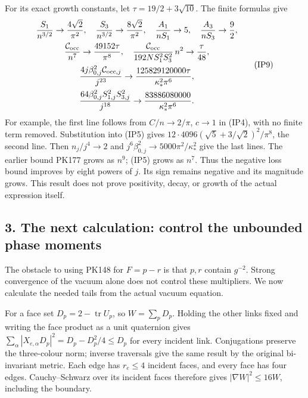 \documentclass[11pt]{article}
\begin{document}
For its exact growth constants, let \(\tau=19/2+3\sqrt{10}\).
The finite formulas give
\[
\begin{gathered}
 {S_1\over n^{3/2}}\to{4\sqrt2\over\pi^2},\quad
 {S_3\over n^{3/2}}\to{8\sqrt2\over\pi^2},\quad
 {A_1\over nS_1}\to5,\quad {A_3\over nS_3}\to{9\over2},\\
 {\mathcal C_{\rm occ}\over n^7}\to{49152\tau\over\pi^8},\quad
 {\mathcal C_{\rm occ}\over192NS_1^2S_3^2}\,n^2\to{\tau\over48},\\
 {4j\beta_{0,j}^2\mathcal C_{{\rm occ},j}\over j^{23}}
 \to {125829120000\tau\over\kappa_*^2\pi^6},\\
 {64\beta_{0,j}^2S_{1,j}^2S_{3,j}^2\over j^{18}}
 \to {83886080000\over\kappa_*^2\pi^6}.
\end{gathered}\tag{IP9}
\]
For example, the first line follows from \(C/n\to2/\pi\), \(c\to1\)
in (IP4), with no finite term removed. Substitution into (IP5) gives
\(12\cdot4096(\sqrt5+3/\sqrt2)^2/\pi^8\), the second line.
Then \(n_j/j^4\to2\) and
\(j^6\beta_{0,j}^2\to5000\pi^2/\kappa_*^2\) give the last lines.
The earlier bound PK177 grows as \(n^9\); (IP5) grows as \(n^7\).
Thus the negative loss bound improves by eight powers of \(j\).
Its sign remains negative and its magnitude grows. This result does
not prove positivity, decay, or growth of the actual expression itself.

\subsection*{3. The next calculation: control the unbounded phase moments}

The obstacle to using PK148 for \(F=p-r\) is that \(p,r\) contain
\(g^{-2}\). Strong convergence of the vacuum alone does not control
these multipliers. We now calculate the needed tails from the actual
vacuum equation.

For a face set \(D_p=2-\operatorname{tr}U_p\), so \(W=\sum_pD_p\).
Holding the other links fixed and writing the face product as a unit
quaternion gives
\(\sum_\alpha|X_{e,\alpha}D_p|^2=D_p-D_p^2/4\le D_p\)
for every incident link. Conjugations preserve the three-colour norm;
inverse traversals give the same result by the original bi-invariant
metric. Each edge has \(r_e\le4\) incident faces, and every face has
four edges. Cauchy–Schwarz over its incident faces therefore gives
\(|\nabla W|^2\le16W\), including the boundary.
\end{document}
